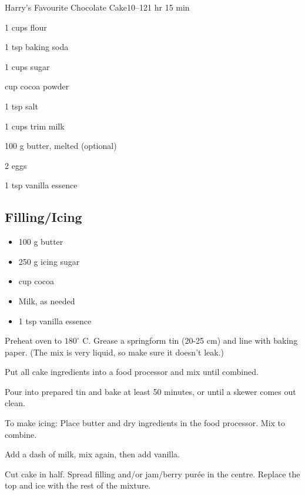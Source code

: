 \begin{recipebox}{Harry’s Favourite Chocolate Cake}{10--12}{1 hr 15 min}
  \begin{ingredients}
    \item 1 cups flour
    \item 1 tsp baking soda
    \item 1 cups sugar
    \item {} cup cocoa powder
    \item 1 tsp salt
    \item 1 cups trim milk
    \item 100 g butter, melted (optional)
    \item 2 eggs
    \item 1 tsp vanilla essence
  \end{ingredients}

  \subsection*{Filling/Icing}
  \begin{itemize}[leftmargin=2em]
    \item 100 g butter
    \item 250 g icing sugar
    \item {} cup cocoa
    \item Milk, as needed
    \item 1 tsp vanilla essence
  \end{itemize}

  \begin{method}
    \item Preheat oven to $180^\circ$ C. Grease a springform tin (20-25 cm) and line with baking paper. (The mix is very liquid, so make sure it doesn’t leak.)
    \item Put all cake ingredients into a food processor and mix until combined.
    \item Pour into prepared tin and bake at least 50 minutes, or until a skewer comes out clean.
    \item To make icing: Place butter and dry ingredients in the food processor. Mix to combine.
    \item Add a dash of milk, mix again, then add vanilla.
    \item Cut cake in half. Spread filling and/or jam/berry purée in the centre. Replace the top and ice with the rest of the mixture.
  \end{method}
\end{recipebox}